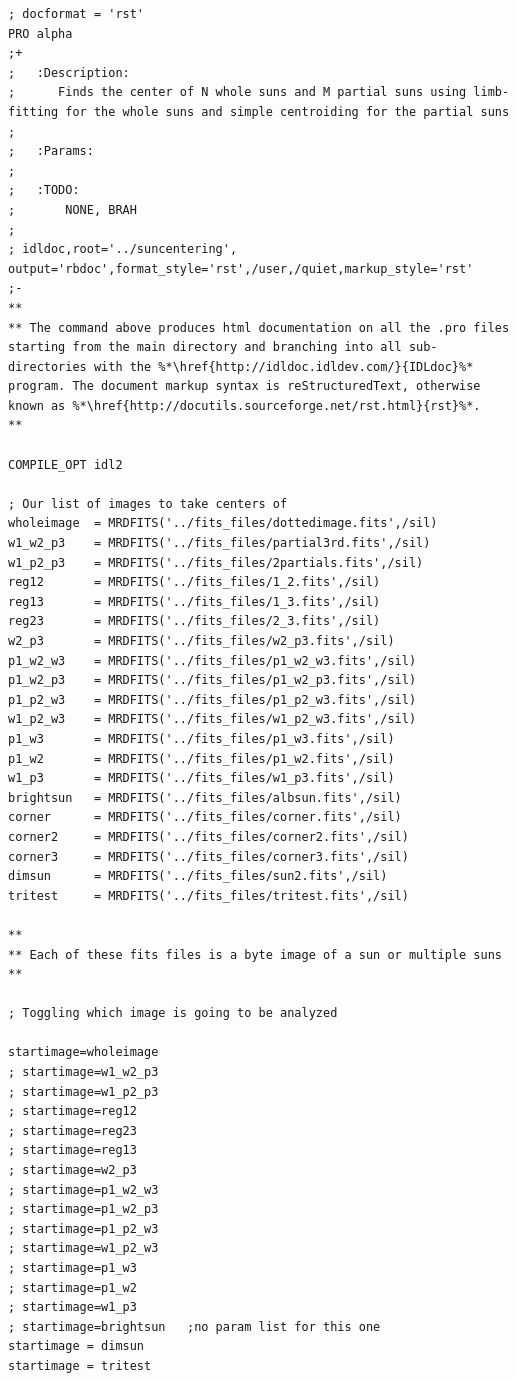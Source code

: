 \documentclass[10pt]{scrartcl}
\begin{document}
\begin{lstlisting}[texcl=false]
; docformat = 'rst'
PRO alpha
;+
;   :Description:
;      Finds the center of N whole suns and M partial suns using limb-fitting for the whole suns and simple centroiding for the partial suns
;
;   :Params:
;
;   :TODO: 
;       NONE, BRAH
;
; idldoc,root='../suncentering', output='rbdoc',format_style='rst',/user,/quiet,markup_style='rst'
;-
**
** The command above produces html documentation on all the .pro files starting from the main directory and branching into all sub-directories with the %*\href{http://idldoc.idldev.com/}{IDLdoc}%* program. The document markup syntax is reStructuredText, otherwise known as %*\href{http://docutils.sourceforge.net/rst.html}{rst}%*.
**

COMPILE_OPT idl2

; Our list of images to take centers of
wholeimage  = MRDFITS('../fits_files/dottedimage.fits',/sil) 
w1_w2_p3    = MRDFITS('../fits_files/partial3rd.fits',/sil)
w1_p2_p3    = MRDFITS('../fits_files/2partials.fits',/sil)
reg12       = MRDFITS('../fits_files/1_2.fits',/sil)
reg13       = MRDFITS('../fits_files/1_3.fits',/sil)
reg23       = MRDFITS('../fits_files/2_3.fits',/sil)
w2_p3       = MRDFITS('../fits_files/w2_p3.fits',/sil)
p1_w2_w3    = MRDFITS('../fits_files/p1_w2_w3.fits',/sil)
p1_w2_p3    = MRDFITS('../fits_files/p1_w2_p3.fits',/sil)
p1_p2_w3    = MRDFITS('../fits_files/p1_p2_w3.fits',/sil)
w1_p2_w3    = MRDFITS('../fits_files/w1_p2_w3.fits',/sil)
p1_w3       = MRDFITS('../fits_files/p1_w3.fits',/sil)
p1_w2       = MRDFITS('../fits_files/p1_w2.fits',/sil)
w1_p3       = MRDFITS('../fits_files/w1_p3.fits',/sil)
brightsun   = MRDFITS('../fits_files/albsun.fits',/sil)
corner      = MRDFITS('../fits_files/corner.fits',/sil)
corner2     = MRDFITS('../fits_files/corner2.fits',/sil)
corner3     = MRDFITS('../fits_files/corner3.fits',/sil)
dimsun      = MRDFITS('../fits_files/sun2.fits',/sil)
tritest     = MRDFITS('../fits_files/tritest.fits',/sil)

**
** Each of these fits files is a byte image of a sun or multiple suns
**

; Toggling which image is going to be analyzed

startimage=wholeimage
; startimage=w1_w2_p3
; startimage=w1_p2_p3
; startimage=reg12
; startimage=reg23
; startimage=reg13
; startimage=w2_p3
; startimage=p1_w2_w3
; startimage=p1_w2_p3
; startimage=p1_p2_w3
; startimage=w1_p2_w3
; startimage=p1_w3
; startimage=p1_w2
; startimage=w1_p3
; startimage=brightsun   ;no param list for this one
startimage = dimsun
startimage = tritest


\end{lstlisting}
\end{document}
